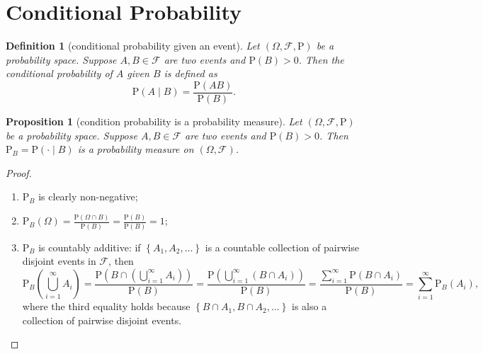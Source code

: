 \documentclass{report}
\newcommand\coex[2]{\mathrm{E}\mleft[\hspace{1pt}#1\,\middle|\, #2\hspace{1pt}\mright]}
\newtheorem{definition}{Definition}[section]
\newtheorem{proposition}{Proposition}[section]
\theoremstyle{nonumberplain}
\newtheorem{proof}{Proof.}
\begin{document}
\section{Conditional Probability}
\begin{definition}[conditional probability given an event]
	Let $(\Omega,\mathcal{F},\mathrm{P})$ be a probability space. Suppose $A,B\in \mathcal{F}$ are two events and $\mathrm{P}(B)>0$. Then the \emph{conditional probability} of $A$ given $B$ is defined as
	\[
		\mathrm{P}(A\mid B)=\frac{\mathrm{P}(AB)}{\mathrm{P}(B)}.
	\]
\end{definition}

\begin{proposition}[condition probability is a probability measure]
	Let $(\Omega,\mathcal{F},\mathrm{P})$ be a probability space. Suppose $A,B\in \mathcal{F}$ are two events and $\mathrm{P}(B)>0$. Then $\mathrm{P}_B=\mathrm{P}(\cdot\mid B)$ is a probability measure on $(\Omega,\mathcal{F})$.
\end{proposition}
\begin{proof}
	\begin{enumerate}
		\item $\mathrm{P}_B$ is clearly non-negative;
		\item $\mathrm{P}_B(\Omega)=\frac{\mathrm{P}(\Omega \cap B)}{\mathrm{P}(B)}=\frac{\mathrm{P}(B)}{\mathrm{P}(B)}=1$;
		\item $\mathrm{P}_B$ is countably additive: if $\left\{A_1, A_2, \ldots\right\}$ is a countable collection of pairwise disjoint events in $\mathcal{F}$, then
		$$
		\mathrm{P}_B\left(\bigcup\limits_{i=1}^{\infty} A_i\right)=\frac{\mathrm{P}\left(B \cap\left(\bigcup\limits_{i=1}^{\infty} A_i\right)\right)}{\mathrm{P}(B)}=\frac{\mathrm{P}\left(\bigcup\limits_{i=1}^{\infty}\left(B \cap A_i\right)\right)}{\mathrm{P}(B)}=\frac{\sum\limits_{i=1}^{\infty} \mathrm{P}\left(B \cap A_i\right)}{\mathrm{P}(B)}=\sum_{i=1}^{\infty} \mathrm{P}_B\left(A_i\right),
		$$
		where the third equality holds because $\left\{B \cap A_1, B \cap A_2, \ldots\right\}$ is also a collection of pairwise disjoint events.
	\end{enumerate}
	
\end{proof}



\end{document}
